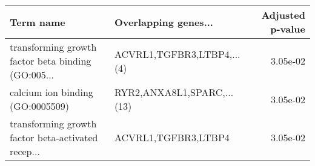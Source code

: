 \begin{tabular}{llr}
\toprule
                                         Term name &       Overlapping genes... &  Adjusted p-value \\
\midrule
transforming growth factor beta binding (GO:005... & ACVRL1,TGFBR3,LTBP4,...(4) &          3.05e-02 \\
                  calcium ion binding (GO:0005509) & RYR2,ANXA8L1,SPARC,...(13) &          3.05e-02 \\
transforming growth factor beta-activated recep... &        ACVRL1,TGFBR3,LTBP4 &          3.05e-02 \\
\bottomrule
\end{tabular}
